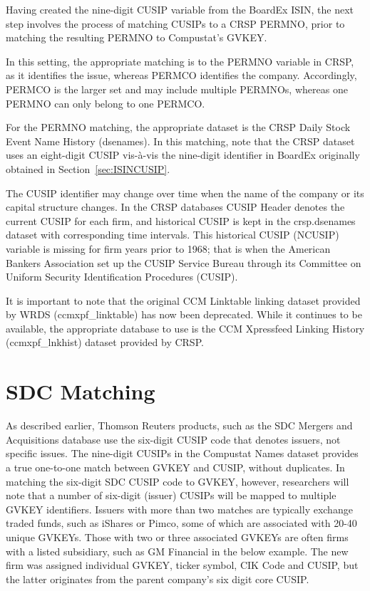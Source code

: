 \documentclass[12pt]{article}
\begin{document}
Having created the nine-digit CUSIP variable from the BoardEx ISIN, the next step involves the process of matching CUSIPs to a CRSP PERMNO, prior to matching the resulting PERMNO to Compustat's GVKEY.

In this setting, the appropriate matching is to the PERMNO variable in CRSP, as it identifies the issue, whereas PERMCO identifies the company.
Accordingly, PERMCO is the larger set and may include multiple PERMNOs, whereas one PERMNO can only belong to one PERMCO.

For the PERMNO matching, the appropriate dataset is the CRSP Daily Stock Event Name History (dsenames).
In this matching, note that the CRSP dataset uses an eight-digit CUSIP vis-\`{a}-vis the nine-digit identifier in BoardEx originally obtained in Section~\ref{sec:ISINCUSIP}.

The CUSIP identifier may change over time when the name of the company or its capital structure changes.
In the CRSP databases CUSIP Header denotes the current CUSIP for each firm, and historical CUSIP is kept in the crsp.dsenames dataset with corresponding time intervals.
This historical CUSIP (NCUSIP) variable is missing for firm years prior to 1968; that is when the American Bankers Association set up the CUSIP Service Bureau through its Committee on Uniform Security Identification Procedures (CUSIP).



It is important to note that the original CCM Linktable linking dataset provided by WRDS (ccmxpf\_linktable) has now been deprecated.
While it continues to be available, the appropriate database to use is the CCM Xpressfeed Linking History (ccmxpf\_lnkhist) dataset provided by CRSP.


\section{SDC Matching}\label{sec:SDC}

As described earlier, Thomson Reuters products, such as the SDC Mergers and Acquisitions database use the six-digit CUSIP code that denotes issuers, not specific issues.
The nine-digit CUSIPs in the Compustat Names dataset provides a true one-to-one match between GVKEY and CUSIP, without duplicates.
In matching the six-digit SDC CUSIP code to GVKEY, however, researchers will note that a number of six-digit (issuer) CUSIPs will be mapped to multiple GVKEY identifiers.
Issuers with more than two matches are typically exchange traded funds, such as iShares or Pimco, some of which are associated with 20-40 unique GVKEYs.
Those with two or three associated GVKEYs are often firms with a listed subsidiary, such as GM Financial in the below example.
The new firm was assigned individual GVKEY, ticker symbol, CIK Code and CUSIP, but the latter originates from the parent company's six digit core CUSIP.
\end{document}
